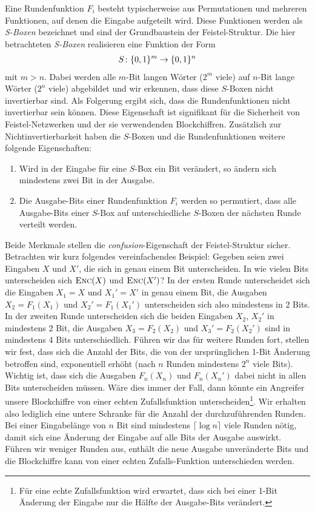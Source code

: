 Eine Rundenfunktion \(F_i\) besteht typischerweise aus Permutationen und mehreren Funktionen, auf denen die Eingabe aufgeteilt wird. Diese Funktionen werden als \textit{S-Boxen} bezeichnet und sind der Grundbaustein der Feistel-Struktur. Die hier betrachteten \textit{S-Boxen} realisieren eine Funktion der Form
\begin{align*}
S \colon \{0, 1\}^m \rightarrow \{0, 1\}^n
\end{align*}
mit \(m > n\). Dabei werden alle $m$-Bit langen Wörter (\(2^m\) viele) auf $n$-Bit lange Wörter (\(2^n\) viele) abgebildet und wir erkennen, dass diese $S$-Boxen nicht invertierbar sind. Als Folgerung ergibt sich, dass die Rundenfunktionen nicht invertierbar sein können. Diese Eigenschaft ist signifikant für die Sicherheit von Feistel-Netzwerken und der sie verwendenden Blockchiffren. Zusätzlich zur Nichtinvertierbarkeit haben die $S$-Boxen und die Rundenfunktionen weitere folgende Eigenschaften:

\begin{enumerate}
	\item Wird in der Eingabe für eine $S$-Box ein Bit verändert, so ändern sich mindestens zwei Bit in der Ausgabe.
	\item Die Ausgabe-Bits einer Rundenfunktion $F_i$ werden so permutiert, dass alle Ausgabe-Bits einer $S$-Box auf unterschiedliche $S$-Boxen der nächsten Runde verteilt werden.
\end{enumerate}

Beide Merkmale stellen die \textit{confusion}-Eigenschaft der Feistel-Struktur sicher. Betrachten wir kurz folgendes vereinfachendes Beispiel:
Gegeben seien zwei Eingaben $X$ und $X'$, die sich in genau einem Bit unterscheiden. In wie vielen Bits unterscheiden sich $\textsc{Enc}(X)$ und $\textsc{Enc}(X')$? 
In der ersten Runde unterscheidet sich die Eingaben $X_1 = X$ und $X_1' = X'$ in genau einem Bit, die Ausgaben $X_2 = F_1(X_1)$ und $X_2' = F_1(X_1')$ unterscheiden sich also mindestens in 2 Bits. In der zweiten Runde unterscheiden sich die beiden Eingaben $X_2$, $X_2'$ in mindestens 2 Bit, die Ausgaben $X_3 = F_2(X_2)$ und $X_3' = F_2(X_2')$ sind in mindestens 4 Bits unterschiedlich. Führen wir das für weitere Runden fort, stellen wir fest, dass sich die Anzahl der Bits, die von der ursprünglichen 1-Bit Änderung betroffen sind, exponentiell erhöht (nach $n$ Runden mindestens $2^n$ viele Bits).
Wichtig ist, dass sich die Ausgaben $F_n(X_n)$ und $F_n(X_n')$ dabei nicht in allen Bits unterscheiden müssen. Wäre dies immer der Fall, dann könnte ein Angreifer unsere Blockchiffre von einer echten Zufallsfunktion unterscheiden\footnote{Für eine echte Zufallsfunktion wird erwartet, dass sich bei einer 1-Bit Änderung der Eingabe nur die Hälfte der Ausgabe-Bits verändert.}. Wir erhalten also lediglich eine untere Schranke für die Anzahl der durchzuführenden Runden. Bei einer Eingabelänge von $n$ Bit sind mindestens $ \lceil \log n \rceil$ viele Runden nötig, damit sich eine Änderung der Eingabe auf alle Bits der Ausgabe auswirkt. Führen wir weniger Runden aus, enthält die neue Ausgabe unveränderte Bits und die Blockchiffre kann von einer echten Zufalls-Funktion unterschieden werden.

